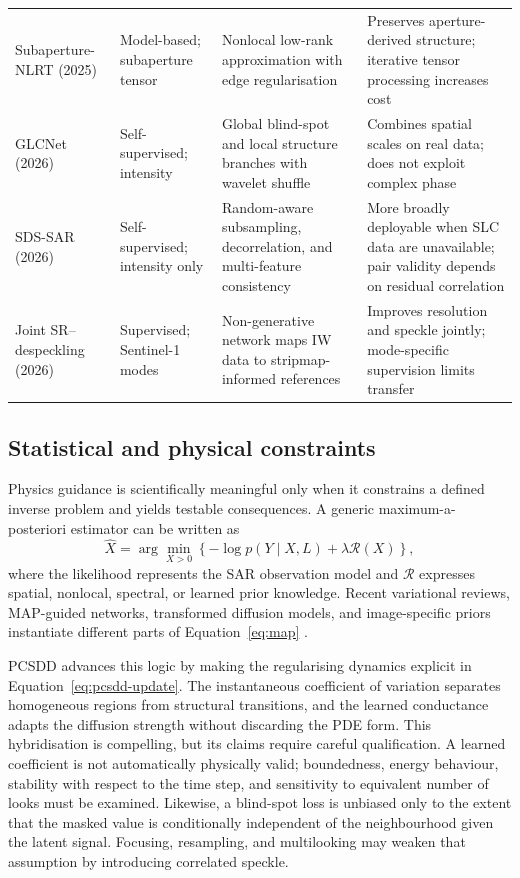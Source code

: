 \documentclass[11pt]{article}
\begin{document}
\begin{table}[t]
\begin{tabularx}{\textwidth}{@{}L{0.16\textwidth}L{0.15\textwidth}L{0.25\textwidth}Y@{}}
Subaperture-NLRT (2025) \cite{An2025Subaperture} & Model-based; subaperture tensor & Nonlocal low-rank approximation with edge regularisation & Preserves aperture-derived structure; iterative tensor processing increases cost \\
GLCNet (2026) \cite{Yang2026GLCNet} & Self-supervised; intensity & Global blind-spot and local structure branches with wavelet shuffle & Combines spatial scales on real data; does not exploit complex phase \\
SDS-SAR (2026) \cite{Chen2026SDSSAR} & Self-supervised; intensity only & Random-aware subsampling, decorrelation, and multi-feature consistency & More broadly deployable when SLC data are unavailable; pair validity depends on residual correlation \\
Joint SR--despeckling (2026) \cite{Amieva2026Joint} & Supervised; Sentinel-1 modes & Non-generative network maps IW data to stripmap-informed references & Improves resolution and speckle jointly; mode-specific supervision limits transfer \\
\bottomrule
\end{tabularx}
\end{table}

\subsection{Statistical and physical constraints}

Physics guidance is scientifically meaningful only when it constrains a defined inverse problem and yields testable consequences. A generic maximum-a-posteriori estimator can be written as
\begin{equation}
\widehat{X}=\arg\min_{X>0}\left\{-\log p(Y\mid X,L)+\lambda\mathcal{R}(X)\right\},
\label{eq:map}
\end{equation}
where the likelihood represents the SAR observation model and $\mathcal{R}$ expresses spatial, nonlocal, spectral, or learned prior knowledge. Recent variational reviews, MAP-guided networks, transformed diffusion models, and image-specific priors instantiate different parts of Equation~\eqref{eq:map} \cite{Baraha2023Review,Zhu2023PBDNN,Ma2024ConditionalDiffusion,Albisani2025S3DIP}.

PCSDD advances this logic by making the regularising dynamics explicit in Equation~\eqref{eq:pcsdd-update}. The instantaneous coefficient of variation separates homogeneous regions from structural transitions, and the learned conductance adapts the diffusion strength without discarding the PDE form. This hybridisation is compelling, but its claims require careful qualification. A learned coefficient is not automatically physically valid; boundedness, energy behaviour, stability with respect to the time step, and sensitivity to equivalent number of looks must be examined. Likewise, a blind-spot loss is unbiased only to the extent that the masked value is conditionally independent of the neighbourhood given the latent signal. Focusing, resampling, and multilooking may weaken that assumption by introducing correlated speckle.
\end{document}
